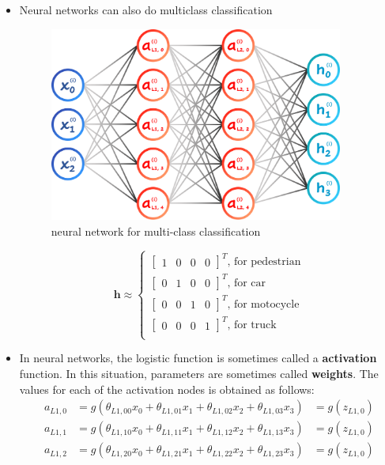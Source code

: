 \begin{itemize}
    \item Neural networks can also do multiclass classification
    \begin{figure}[H]
        \centering
        \includegraphics[width=3.8in]{./images/multiClassClassification.png}
        \caption{neural network for multi-class classification}
    \end{figure}

    \begin{equation}
        \mathbf{h} \approx \left\{ \begin{array}{l}

        \left[ \begin{matrix} 1 & 0 & 0 & 0 \end{matrix} \right]^T \text{, for pedestrian}\\
        \left[ \begin{matrix} 0 & 1 & 0 & 0 \end{matrix} \right]^T \text{, for car}\\
        \left[ \begin{matrix} 0 & 0 & 1 & 0 \end{matrix} \right]^T \text{, for motocycle}\\
        \left[ \begin{matrix} 0 & 0 & 0 & 1 \end{matrix} \right]^T \text{, for truck}\\

        \end{array}\right.
    \end{equation}

    \item In neural networks, the logistic function is sometimes called a \textbf{activation} function. In this situation, parameters are sometimes called \textbf{weights}.
    The values for each of the activation nodes is obtained as follows:
    \begin{equation}
        \begin{aligned}
            a_{L1,0} &= g(\theta_{L1, 00}x_0 + \theta_{L1, 01}x_1 + \theta_{L1, 02}x_2 + \theta_{L1, 03}x_3) &= g(z_{L1, 0})\\
            a_{L1,1} &= g(\theta_{L1, 10}x_0 + \theta_{L1, 11}x_1 + \theta_{L1, 12}x_2 + \theta_{L1, 13}x_3) &= g(z_{L1, 0})\\
            a_{L1,2} &= g(\theta_{L1, 20}x_0 + \theta_{L1, 21}x_1 + \theta_{L1, 22}x_2 + \theta_{L1, 23}x_3) &= g(z_{L1, 0})\\
        \end{aligned}
    \end{equation}


\end{itemize}
